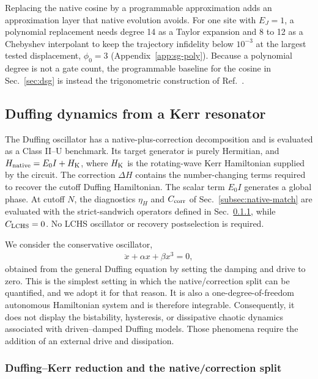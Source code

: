 \documentclass[pra,twocolumn,superscriptaddress,nofootinbib,floatfix]{revtex4-2}
\theoremstyle{remark}
\newcommand{\revcolor}{\color{blue}}
\DeclareRobustCommand{\rev}[1]{{\revcolor #1}}
\begin{document}
\rev{Replacing the native cosine by a programmable approximation adds an approximation layer that native evolution avoids.} \rev{For one site with \(E_J=1\), a polynomial replacement needs degree 14 as a Taylor expansion and 8 to 12 as a Chebyshev interpolant to keep the trajectory infidelity below \(10^{-3}\) at the largest tested displacement, \(\phi_0=3\) (Appendix~\ref{app:sg-poly}).} \rev{Because a polynomial degree is not a gate count, the programmable baseline for the cosine in Sec.~\ref{sec:dsg} is instead the trigonometric construction of Ref.~\cite{Rainaldi2026TrigonometricCV}.}

\subsection{\rev{Duffing dynamics from a Kerr resonator}}
\label{sec:duffing}

The Duffing oscillator has a native-plus-correction decomposition and is evaluated as a Class II--U benchmark. Its target generator is purely Hermitian, and \(H_{\rm native}=E_0I+H_{\rm K}\), where \(H_{\rm K}\) is the rotating-wave Kerr Hamiltonian supplied by the circuit. The correction \(\Delta H\) contains the number-changing terms required to recover the cutoff Duffing Hamiltonian. The scalar term \(E_0I\) generates a global phase. \rev{At cutoff \(N\), the diagnostics \(\eta_H\) and \(C_{\rm corr}\) of Sec.~\ref{subsec:native-match} are evaluated with the strict-sandwich operators defined in Sec.~\ref{subsec:df-reduction}, while \(C_{\rm LCHS}=0\).} No LCHS oscillator or recovery postselection is required.

We consider the conservative oscillator,
\begin{align}
\ddot x+\alpha x+\beta x^3=0,
\end{align}
obtained from the general Duffing equation by setting the damping and drive to zero. This is the simplest setting in which the native/correction split can be quantified, and we adopt it for that reason. It is also a one-degree-of-freedom autonomous Hamiltonian system and is therefore integrable. Consequently, it does not display the bistability, hysteresis, or dissipative chaotic dynamics associated with driven--damped Duffing models. Those phenomena require the addition of an external drive and dissipation.

\subsubsection{Duffing--Kerr reduction and the native/correction split}
\label{subsec:df-reduction}
\end{document}
